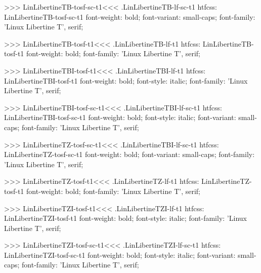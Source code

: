 {{{{{{{>>>
\<LinLibertineTB-tosf-sc-t1\><<<
.LinLibertineTB-lf-sc-t1
htfcss:  LinLibertineTB-tosf-sc-t1  font-weight: bold; font-variant: small-caps; font-family: 'Linux Libertine T', serif;

>>>
\<LinLibertineTB-tosf-t1\><<<
.LinLibertineTB-lf-t1
htfcss:  LinLibertineTB-tosf-t1  font-weight: bold; font-family: 'Linux Libertine T', serif;

>>>
\<LinLibertineTBI-tosf-t1\><<<
.LinLibertineTBI-lf-t1
htfcss:  LinLibertineTBI-tosf-t1  font-weight: bold; font-style: italic; font-family: 'Linux Libertine T', serif;

>>>
\<LinLibertineTBI-tosf-sc-t1\><<<
.LinLibertineTBI-lf-sc-t1
htfcss:  LinLibertineTBI-tosf-sc-t1  font-weight: bold; font-style: italic; font-variant: small-caps; font-family: 'Linux Libertine T', serif;

>>>
\<LinLibertineTZ-tosf-sc-t1\><<<
.LinLibertineTBI-lf-sc-t1
htfcss:  LinLibertineTZ-tosf-sc-t1  font-weight: bold; font-variant: small-caps; font-family: 'Linux Libertine T', serif;

>>>
\<LinLibertineTZ-tosf-t1\><<<
.LinLibertineTZ-lf-t1
htfcss:  LinLibertineTZ-tosf-t1  font-weight: bold; font-family: 'Linux Libertine T', serif;

>>>
\<LinLibertineTZI-tosf-t1\><<<
.LinLibertineTZI-lf-t1
htfcss:  LinLibertineTZI-tosf-t1  font-weight: bold; font-style: italic; font-family: 'Linux Libertine T', serif;

>>>
\<LinLibertineTZI-tosf-sc-t1\><<<
.LinLibertineTZI-lf-sc-t1
htfcss:  LinLibertineTZI-tosf-sc-t1  font-weight: bold; font-style: italic; font-variant: small-caps; font-family: 'Linux Libertine T', serif;

}}}}}}}
